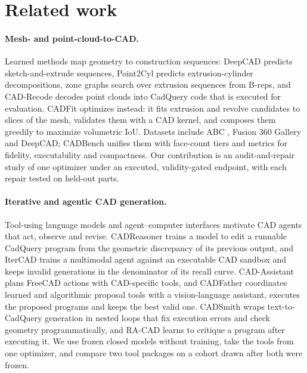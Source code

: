 \section{Related work}
\label{sec:related}

\paragraph{Mesh- and point-cloud-to-CAD.}
Learned methods map geometry to construction sequences: DeepCAD \citep{wu2021deepcad} predicts sketch-and-extrude sequences, Point2Cyl \citep{uy2022point2cyl} predicts extrusion-cylinder decompositions, zone graphs \citep{xu2021zonegraphs} search over extrusion sequences from B-reps, and CAD-Recode \citep{rukhovich2025cadrecode} decodes point clouds into CadQuery code that is executed for evaluation. CADFit \citep{nehme2026cadfit} optimizes instead: it fits extrusion and revolve candidates to slices of the mesh, validates them with a CAD kernel, and composes them greedily to maximize volumetric IoU. Datasets include ABC \citep{koch2019abc}, Fusion 360 Gallery \citep{willis2021fusion360} and DeepCAD; CADBench \citep{doris2026cadbench} unifies them with face-count tiers and metrics for fidelity, executability and compactness. Our contribution is an audit-and-repair study of one optimizer under an executed, validity-gated endpoint, with each repair tested on held-out parts.

\paragraph{Iterative and agentic CAD generation.}
Tool-using language models \citep{yao2023react,schick2023toolformer} and agent--computer interfaces \citep{yang2024sweagent} motivate CAD agents that act, observe and revise. CADReasoner \citep{kabisov2026cadreasoner} trains a model to edit a runnable CadQuery program from the geometric discrepancy of its previous output, and IterCAD \citep{hu2026itercad} trains a multimodal agent against an executable CAD sandbox and keeps invalid generations in the denominator of its recall curve. CAD-Assistant \citep{mallis2025cadassistant} plans FreeCAD actions with CAD-specific tools, and CADFather \citep{savrasov2026cadfather} coordinates learned and algorithmic proposal tools with a vision-language assistant, executes the proposed programs and keeps the best valid one. CADSmith \citep{barkley2026cadsmith} wraps text-to-CadQuery generation in nested loops that fix execution errors and check geometry programmatically, and RA-CAD \citep{yan2026racad} learns to critique a program after executing it. We use frozen closed models without training, take the tools from one optimizer, and compare two tool packages on a cohort drawn after both were frozen.

